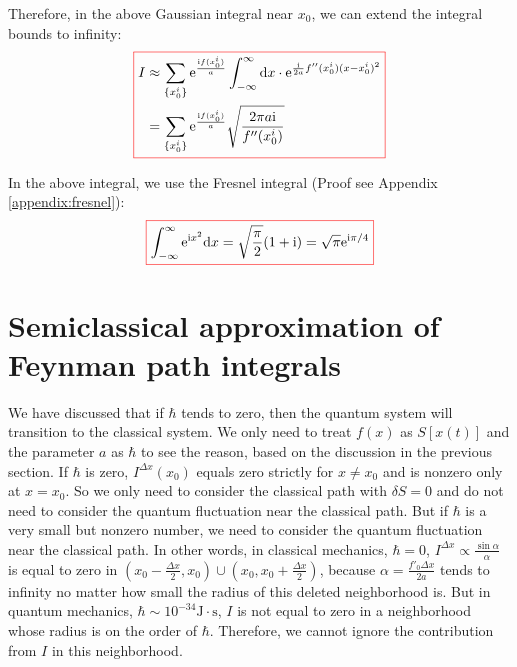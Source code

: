 Therefore, in the above Gaussian integral near $x_0$, we can extend the integral bounds to infinity:
\begin{equation}
    \colorboxed{
    \begin{aligned}
    I &\approx \sum_{\{x_0^i\}} \mathrm{e}^{\frac{\mathrm{i}f(x_0^i)}{a}} \int_{-\infty}^{\infty} \mathrm{d}x \cdot \mathrm{e}^{\frac{\mathrm{i}}{2a} f''(x_0^i)(x-x_0^i)^2} \\
    &= \sum_{\{x_0^i\}} \mathrm{e}^{\frac{\mathrm{i}f(x_0^i)}{a}} \sqrt{\frac{2\pi a \mathrm{i}}{f''(x_0^i)}}
    \end{aligned}
    }
\end{equation}

In the above integral, we use the Fresnel integral (Proof see Appendix \ref{appendix:fresnel}):
\begin{equation}
    \colorboxed{
        \int_{-\infty}^{\infty} \me^{\mi x^2} \md x = \sqrt{\frac{\mpi}{2}}(1+\mi) = \sqrt{\mpi} \me^{\mi\mpi/4}
    }
\end{equation}

\section{Semiclassical approximation of Feynman path integrals}
We have discussed that if $\hbar$ tends to zero, then the quantum system will transition to the classical system.
We only need to treat $f(x)$ as $S[x(t)]$ and the parameter $a$ as $\hbar$ to see the reason, based on the discussion in the previous section.
If $\hbar$ is zero, $I^{\Delta x}(x_0)$ equals zero strictly for $x \neq x_0$ and is nonzero only at $x=x_0$.
So we only need to consider the classical path with $\delta S=0$ and do not need to consider the quantum fluctuation near the classical path.
But if $\hbar$ is a very small but nonzero number, we need to consider the quantum fluctuation near the classical path. 
In other words, in classical mechanics,
$\hbar=0$, $I^{\Delta x} \propto \frac{\sin\alpha}{\alpha}$ is equal to zero in $(x_0-\frac{\Delta x}{2}, x_0) \cup (x_0, x_0+\frac{\Delta x}{2})$,
because $\alpha = \frac{f'_0 \Delta x}{2a}$ tends to infinity no matter how small the radius of this deleted neighborhood is.
But in quantum mechanics, $\hbar \sim 10^{-34} \mathrm{J}\cdot\mathrm{s}$, 
$I$ is not equal to zero in a neighborhood whose radius is on the order of $\hbar$.
Therefore, we cannot ignore the contribution from $I$ in this neighborhood.

